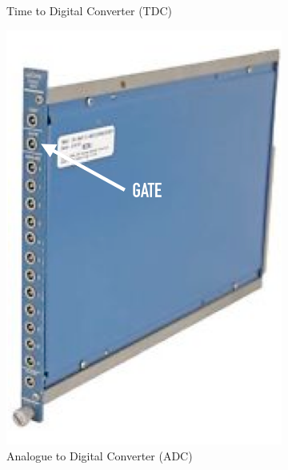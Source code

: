 \begin{figure}[p]
\begin{subfigure}[t]{0.2\textwidth}
        \caption{Time to Digital Converter (TDC)}
        \label{fig:TDC}
    \end{subfigure}
    \hfill	
    \begin{subfigure}[t]{0.25\textwidth}
        \includegraphics[height=0.25\textheight, width=\textwidth, keepaspectratio]{figures/gate.png}
        \caption{Analogue to Digital Converter (ADC)}
        \label{fig:}
    \end{subfigure}    
    \hfill
    \begin{subfigure}[t]{0.45\textwidth}

\end{subfigure}
\end{figure}

